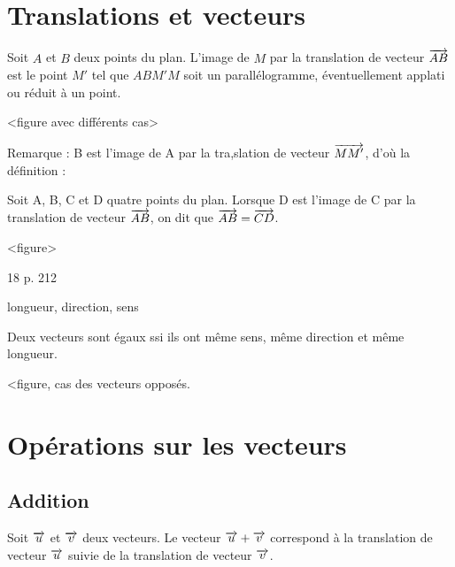 \documentclass[a4paper,11pt,DIV18,BCOR0mm]{scrartcl}
\begin{document}
\section{Translations et vecteurs}
\begin{definition}
Soit $A$ et $B$ deux points du plan.
L'image de $M$ par la translation de vecteur $\overrightarrow{AB}$
est le point $M'$ tel que $ABM'M$ soit un parallélogramme,
éventuellement applati ou réduit à un point.
\end{definition}

<figure avec différents cas>


Remarque : B est l'image de A par la tra,slation de vecteur $\overrightarrow{MM'}$,
d'où la définition :

\begin{definition}
Soit A, B, C et D quatre points du plan.
Lorsque D est l'image de C par la translation de vecteur
$\overrightarrow{AB}$, on dit que $\overrightarrow{AB}=\overrightarrow{CD}$. 
\end{definition}


<figure>

\exercice{}18 p. 212


\begin{definition}
longueur, direction, sens
\end{definition}


\begin{theoreme}
Deux vecteurs sont égaux ssi ils ont même sens,
même direction et même longueur.
\end{theoreme}

<figure, cas des vecteurs opposés.




\section{Opérations sur les vecteurs}
\subsection{Addition}
\begin{definition}
Soit $\overrightarrow{u}$ et $\overrightarrow{v}$ deux vecteurs.
Le vecteur $\overrightarrow{u}+\overrightarrow{v}$ correspond à la translation de vecteur
$\overrightarrow{u}$ suivie de la translation de vecteur $\overrightarrow{v}$.
\end{definition}
\end{document}
